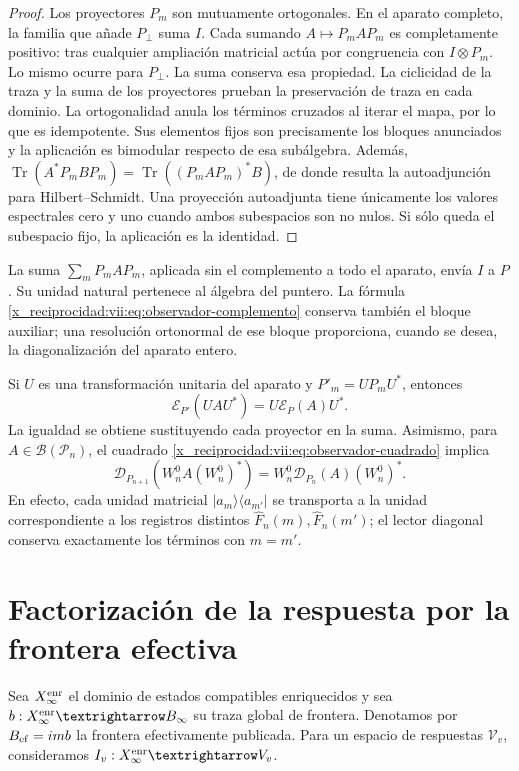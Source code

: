 \begin{proof}
Los proyectores \(P_m\) son mutuamente ortogonales. En el aparato
completo, la familia que añade \(P_\perp\) suma \(I\). Cada sumando
\(A\mapsto P_mAP_m\) es completamente positivo: tras cualquier
ampliación matricial actúa por congruencia con \(I\otimes P_m\).
Lo mismo ocurre para \(P_\perp\). La suma conserva esa propiedad.
La ciclicidad de la traza y la suma de los proyectores prueban la
preservación de traza en cada dominio. La ortogonalidad anula los
términos cruzados al iterar el mapa, por lo que es idempotente.
Sus elementos fijos son precisamente los bloques anunciados y la
aplicación es bimodular respecto de esa subálgebra.
Además,
\(\operatorname{Tr}(A^*P_mBP_m)
 =\operatorname{Tr}((P_mAP_m)^*B)\),
de donde resulta la autoadjunción para Hilbert--Schmidt. Una proyección
autoadjunta tiene únicamente los valores espectrales cero y uno cuando
ambos subespacios son no nulos. Si sólo queda el subespacio fijo,
la aplicación es la identidad.
\end{proof}

La suma \(\sum_mP_mAP_m\), aplicada sin el complemento a todo el
aparato, envía \(I\) a \(P\). Su unidad natural pertenece al álgebra
del puntero. La fórmula \eqref{x_reciprocidad:vii:eq:observador-complemento} conserva
también el bloque auxiliar; una resolución ortonormal de ese bloque
proporciona, cuando se desea, la diagonalización del aparato entero.

Si \(U\) es una transformación unitaria del aparato y
\(P'_m=UP_mU^*\), entonces
\[
 \mathcal E_{P'}(UAU^*)=U\mathcal E_P(A)U^*.
\]
La igualdad se obtiene sustituyendo cada proyector en la suma.
Asimismo, para \(A\in\mathcal B(\mathcal P_n)\), el cuadrado
\eqref{x_reciprocidad:vii:eq:observador-cuadrado} implica
\[
 \mathcal D_{P_{n+1}}(W_n^0A(W_n^0)^*)
 =W_n^0\mathcal D_{P_n}(A)(W_n^0)^*.
\]
En efecto, cada unidad matricial \(|a_m\rangle\langle a_{m'}|\)
se transporta a la unidad correspondiente a los registros distintos
\(\widehat F_n(m),\widehat F_n(m')\); el lector diagonal conserva
exactamente los términos con \(m=m'\).

\section{Factorización de la respuesta por la frontera efectiva}
\label{x_reciprocidad:vii:sec:observador-factorizacion}

Sea \(\mathcal X_\infty^{\rm enr}\) el dominio de estados compatibles
enriquecidos y sea
\(b:\mathcal X_\infty^{\rm enr}\longrightarrow B_\infty\) su traza
global de frontera. Denotamos por \(B_{\rm ef}=\operatorname{im}b\)
la frontera efectivamente publicada. Para un espacio de respuestas
\(\mathcal V_v\), consideramos
\(I_v:\mathcal X_\infty^{\rm enr}\longrightarrow\mathcal V_v\).

